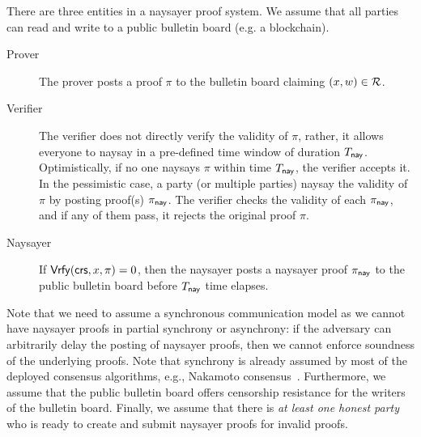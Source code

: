 There are three entities in a naysayer proof system. We assume that all parties can read and write to a public bulletin board (e.g. a blockchain).
\begin{description}
    \item[Prover] The prover posts a proof $\pi$ to the bulletin board claiming $(x,w)\in\mathcal{R}$. 
    \item[Verifier] The verifier does not directly verify the validity of $\pi$, rather, it allows everyone to naysay in a pre-defined time window of duration $T_{\mathsf{nay}}$.
    Optimistically, if no one naysays $\pi$ within time $T_{\mathsf{nay}}$, the verifier accepts it. In the pessimistic case, a party (or multiple parties) naysay the validity of $\pi$ by posting proof(s) $\pi_{\mathsf{nay}}$. The verifier checks the validity of each $\pi_{\mathsf{nay}}$, and if any of them pass, it rejects the original proof $\pi$.
    \item[Naysayer] If $\mathsf{Vrfy}(\mathsf{crs}, x,\pi)=0$, then the naysayer posts a naysayer proof $\pi_{\mathsf{nay}}$ to the public bulletin board before $T_{\mathsf{nay}}$ time elapses.
\end{description}

Note that we need to assume a synchronous communication model as we cannot have naysayer proofs in partial synchrony or asynchrony: if the adversary can arbitrarily delay the posting of naysayer proofs, then we cannot enforce soundness of the underlying proofs. Note that synchrony is already assumed by most of the deployed consensus algorithms, e.g., Nakamoto consensus~\cite{Nakamoto08}. Furthermore, we assume that the public bulletin board offers censorship resistance for the writers of the bulletin board. Finally, we assume that there is \emph{at least one honest party} who is ready to create and submit naysayer proofs for invalid proofs.